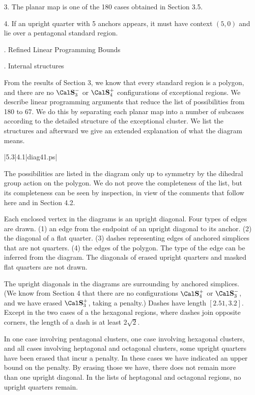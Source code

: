 3.  The planar map is one of the 180 cases obtained in Section 3.5.

4.  If an upright quarter with 5 anchors appears, it must have
	context $(5,0)$ and lie over a pentagonal standard region.


.  Refined Linear Programming Bounds\endhead

. Internal structures\endsubhead

From the results of Section 3, we know that every standard region
is a polygon, and there are no $\Sminus$ or $\Sfour$ configurations
of exceptional regions.  We describe linear programming arguments that
reduce the list of possibilities from 180 to 67.  We do this by
separating each planar map into a  number of subcases according to
the detailed structure of the exceptional cluster.
We list the structures and afterward we give an extended explanation
of what the diagram means.


\vfill\eject
\gram|5.3|4.1|diag41.ps|
\vfill\eject

The possibilities are listed in the diagram only up to symmetry
by the dihedral group action on the polygon.  We do not prove
the completeness of the list, but its completeness can be seen
by inspection, in view of the comments that follow here and
in Section 4.2.

Each enclosed vertex in the diagrams is an upright diagonal.  
Four types of edges are drawn. (1) an edge from the endpoint
of an upright diagonal to its anchor. (2) the diagonal of
a  flat quarter. (3) dashes representing edges of anchored
simplices that are not quarters.  (4) the edges of the polygon.
The type of the edge can be inferred from 
the diagram.  The diagonals of erased upright quarters and
masked flat quarters are not drawn.

The upright diagonals in the diagrams are surrounding by anchored
simplices.  (We know from Section 4 that there are no configurations
$\Sfour$ or $\Sminus$, and we have erased $\Splus$, taking a penalty.)
Dashes have length $[2.51,3.2]$.  Except in the two cases
of a the hexagonal regions, where dashes join opposite corners,
the length of a dash is at least $2\sqrt2$.

In one case involving pentagonal clusters, one case involving
hexagonal clusters, and all cases involving heptagonal and octagonal
clusters, some upright quarters have been erased that incur a penalty.
In these cases we have indicated an upper bound on the penalty.
By erasing those we have, there does not remain more than one upright
diagonal. In the lists of heptagonal and octagonal regions, no
upright quarters remain.


